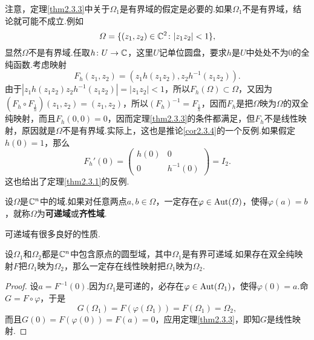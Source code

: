 注意，定理\ref{thm2.3.3}中关于$\Omega_1$是有界域的假定是必要的.如果$\Omega_1$不是有界域，结论就可能不成立.例如
\[\varOmega=\{(z_1,z_2)\in\mathbb C^2\colon|z_1z_2|<1\},\]
显然$\Omega$不是有界域.任取$h\colon U\to\mathbb C$，这里$U$记单位圆盘，要求$h$是$U$中处处不为$0$的全纯函数.考虑映射
\[F_h(z_1,z_2)=(z_1 h(z_1z_2),z_2 h^{-1}(z_1z_2)).\]
由于$\left|z_1 h(z_1z_2)z_2 h^{-1}(z_1z_2)\right|=|z_1z_2|<1$，所以$F_h(\Omega)\subset\Omega$，又因为$\left(F_h\circ F_{\frac1h}\right)(z_1,z_2)=(z_1,z_2)$，所以$(F_h)^{-1}=F_{\frac1h}$，因而$F_h$是把$\Omega$映为$\Omega$的双全纯映射，而且$F_h(0,0)=0$，因而定理\ref{thm2.3.3}的条件都满足，但$F_h$不是线性映射，原因就是$\Omega$不是有界域.实际上，这也是推论\ref{cor2.3.4}的一个反例.如果假定$h(0)=1$，那么
\[F_h '(0)=
\begin{pmatrix}
	h(0) & 0\\
	0 & h^{-1}(0)
\end{pmatrix}=I_2.\]
这也给出了定理\ref{thm2.3.1}的反例.
\begin{definition}\label{def2.3.5}
	设$\Omega$是$\mathbb C^n$中的域.如果对任意两点$a,b\in\Omega$，一定存在$\varphi\in\operatorname{Aut}(\varOmega)$，使得$\varphi(a)=b$，就称$\Omega$为\textbf{可递域}或\textbf{齐性域}.
\end{definition}
可递域有很多良好的性质.
\begin{theorem}\label{thm2.3.6}
	设$\Omega_1$和$\Omega_2$都是$\mathbb C^n$中包含原点的圆型域，其中$\Omega_1$是有界可递域.如果存在双全纯映射$F$把$\Omega_1$映为$\Omega_2$，那么一定存在线性映射把$\Omega_1$映为$\Omega_2$.
\end{theorem}
\begin{proof}
	设$a=F^{-1}(0)$.因为$\Omega_1$是可递的，必存在$\varphi\in\operatorname{Aut}(\varOmega_1)$，使得$\varphi(0)=a$.命$G=F\circ\varphi$，于是
	\[G(\Omega_1)=F(\varphi(\Omega_1))=F(\Omega_1)=\Omega_2,\]
	而且$G(0)=F(\varphi(0))=F(a)=0$，应用定理\ref{thm2.3.3}，即知$G$是线性映射.
\end{proof}
